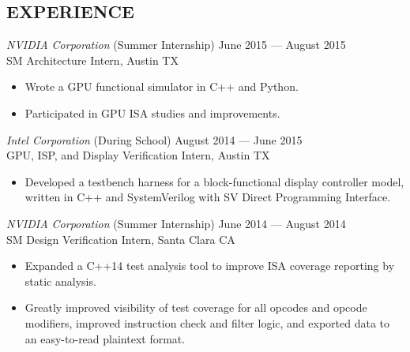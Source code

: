\documentclass[margin]{res}
\begin{document}
\begin{resume}
  \section{EXPERIENCE}
  {\sl NVIDIA Corporation}
  \hfill (Summer Internship) June 2015 --- August 2015 \\
  SM Architecture Intern, Austin TX
  \vspace{0.25em}
  \begin{itemize}
  \item Wrote a GPU functional simulator in C++ and Python.
  \item Participated in GPU ISA studies and improvements.
  \end{itemize}
  \vspace{-.5em}
  {\sl Intel Corporation}
  \hfill (During School) August 2014 --- June 2015 \\
  GPU, ISP, and Display Verification Intern, Austin TX
  \vspace{0.25em}
  \begin{itemize}
  \item Developed a testbench harness for a block-functional display controller
    model, written in C++ and SystemVerilog with SV Direct Programming
    Interface.
  \end{itemize}
  \vspace{-.5em}
  {\sl NVIDIA Corporation}
  \hfill (Summer Internship) June 2014 --- August 2014 \\
  SM Design Verification Intern, Santa Clara CA
  \vspace{0.25em}
  \begin{itemize}
  \item Expanded a C++14 test analysis tool to improve ISA coverage reporting
    by static analysis.
  \item Greatly improved visibility of test coverage for all opcodes and opcode
    modifiers, improved instruction check and filter logic, and exported data to
    an easy-to-read plaintext format.
  \end{itemize}

\end{resume}
\end{document}
